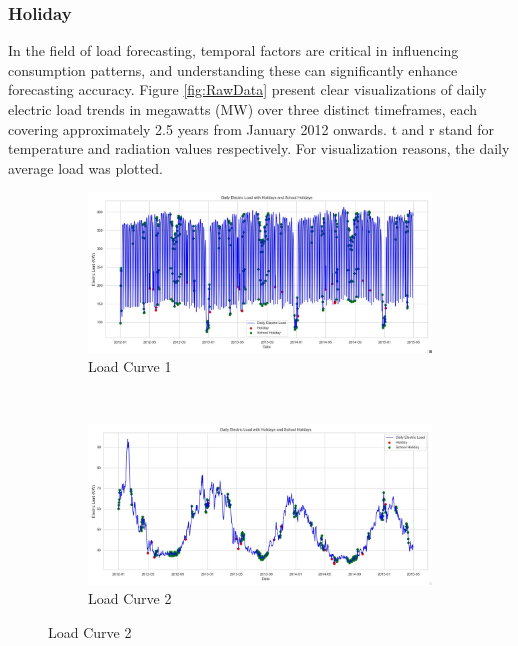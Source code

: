 \documentclass{article} %
\begin{document}
\subsubsection{Holiday}
In the field of load forecasting, temporal factors are critical in influencing consumption patterns, and understanding these can significantly enhance forecasting accuracy. Figure \ref{fig:RawData} present clear visualizations of daily electric load trends in megawatts (MW) over three distinct timeframes, each covering approximately 2.5 years from January 2012 onwards. t and r stand for temperature and radiation values respectively. For visualization reasons, the daily average load was plotted. 
\begin{figure}[!htb]
    \centering
    \begin{subfigure}[b]{\textwidth}
        \centering
        \includegraphics[width=\textwidth]{ressources/Holiday/lectricLoad_holiday.jpg}
        \caption{Load Curve 1}
        \label{fig:RawData1}
    \end{subfigure}
    \\
    \begin{subfigure}[b]{\textwidth}
        \centering
        \includegraphics[width=\textwidth]{ressources/Holiday/lectricLoad_holiday(1).jpg}
        \caption{Load Curve 2}
        \label{fig:RawData2}
    \end{subfigure}

\end{figure}
\end{document}
